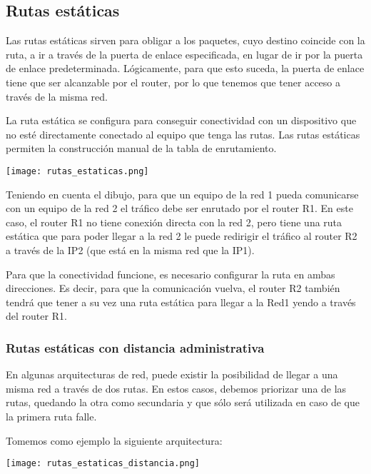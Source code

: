 \hypertarget{rutas_estaticas}{}
\subsection{Rutas estáticas}
Las rutas estáticas sirven para obligar a los paquetes, cuyo destino coincide con la ruta, a ir a través de la puerta de enlace especificada, en lugar de ir por la puerta de enlace predeterminada. Lógicamente, para que esto suceda, la puerta de enlace tiene que ser alcanzable por el router, por lo que tenemos que tener acceso a través de la misma red.


La ruta estática se configura para conseguir conectividad con un dispositivo que no esté directamente conectado al equipo que tenga las rutas. Las rutas estáticas permiten la construcción manual de la tabla de enrutamiento.

\begin{center}
    \vspace{-15pt}
    \texttt{[image: rutas\_estaticas.png]}
    \vspace{-25pt}
\end{center}

Teniendo en cuenta el dibujo, para que un equipo de la red 1 pueda comunicarse con un equipo de la red 2 el tráfico debe ser enrutado por el router R1. En este caso, el router R1 no tiene conexión directa con la red 2, pero tiene una ruta estática que para poder llegar a la red 2 le puede redirigir el tráfico al router R2 a través de la IP2 (que está en la misma red que la IP1).

Para que la conectividad funcione, es necesario configurar la ruta en ambas direcciones. Es decir, para que la comunicación vuelva, el router R2 también tendrá que tener a su vez una ruta estática para llegar a la Red1 yendo a través del router R1.



\subsubsection{Rutas estáticas con distancia administrativa}
En algunas arquitecturas de red, puede existir la posibilidad de llegar a una misma red a través de dos rutas. En estos casos, debemos priorizar una de las rutas, quedando la otra como secundaria y que sólo será utilizada en caso de que la primera ruta falle.

Tomemos como ejemplo la siguiente arquitectura:

\begin{center}
    \vspace{-15pt}
    \texttt{[image: rutas\_estaticas\_distancia.png]}
    \vspace{-25pt}
\end{center}

